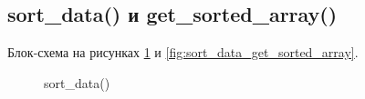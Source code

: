 \subsection{sort\_data() и get\_sorted\_array()}

Блок-схема на рисунках \ref{fig:sort_data_sort_data} и \ref{fig:sort_data_get_sorted_array}.

\begin{figure}[p]
    \caption{sort\_data()}
    \label{fig:sort_data_sort_data}
\end{figure}

